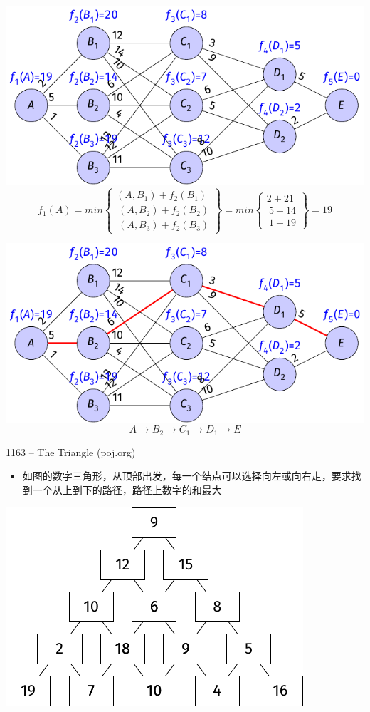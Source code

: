 \begin{frame}
    \includegraphics{fig/4-2-9.pdf}
    $$f_1(A)=min \begin{Bmatrix}(A,B_1)+f_2(B_1)\\\ (A,B_2)+f_2(B_2)\\\ (A,B_3)+f_2(B_3) \end{Bmatrix} =min \begin{Bmatrix}2+21\\\ 5+14\\\ 1+19 \end{Bmatrix} =19$$
\end{frame}
\begin{frame}
    \includegraphics{fig/4-2-10.pdf}
    $$A\rightarrow B_2\rightarrow C_1 \rightarrow D_1 \rightarrow E$$
\end{frame}
\begin{frame}{1163 -- The Triangle (poj.org)}
    \begin{itemize}
        \item 如图的数字三角形，从顶部出发，每一个结点可以选择向左或向右走，要求找到一个从上到下的路径，路径上数字的和最大
    \end{itemize}
    \vfill
    \includegraphics[center]{fig/4-3.pdf}
\end{frame}
